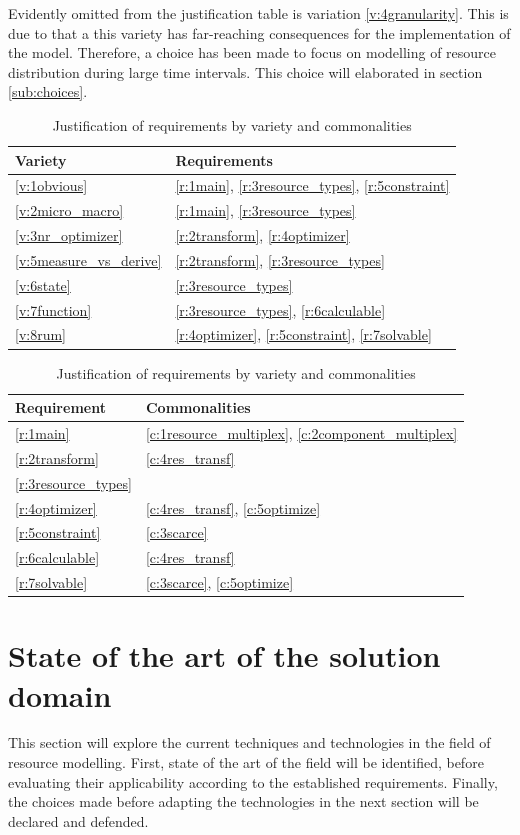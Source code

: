 Evidently omitted from the justification table is variation \ref{v:4granularity}. This is due to that a this variety has far-reaching consequences for the implementation of the model. Therefore, a choice has been made to focus on modelling of resource distribution during large time intervals. This choice will elaborated in section \ref{sub:choices}.
\begin{table}
\centering
\begin{tabular}{|l|l|} \hline
Variety & Requirements \\ \hline
\ref{v:1obvious} & \ref{r:1main}, \ref{r:3resource_types}, \ref{r:5constraint}		\\ \hline
\ref{v:2micro_macro} & \ref{r:1main}, \ref{r:3resource_types} 	\\ \hline
\ref{v:3nr_optimizer} & \ref{r:2transform}, \ref{r:4optimizer} 	\\ \hline
\ref{v:5measure_vs_derive} & \ref{r:2transform}, \ref{r:3resource_types} \\ 	\hline
\ref{v:6state} & \ref{r:3resource_types} 	\\ \hline
\ref{v:7function} & \ref{r:3resource_types}, \ref{r:6calculable} 	\\ \hline
\ref{v:8rum} & \ref{r:4optimizer}, \ref{r:5constraint}, \ref{r:7solvable} 	\\ \hline
\end{tabular}
\hspace{24px}
\begin{tabular}{|l|l|} \hline
Requirement & Commonalities \\ \hline
\ref{r:1main} & \ref{c:1resource_multiplex}, \ref{c:2component_multiplex}	\\ \hline
\ref{r:2transform} & \ref{c:4res_transf}	\\ \hline
\ref{r:3resource_types} &	\\ \hline
\ref{r:4optimizer} & \ref{c:4res_transf}, \ref{c:5optimize} 	\\ \hline
\ref{r:5constraint} & \ref{c:3scarce}	\\ \hline
\ref{r:6calculable} & \ref{c:4res_transf}	\\ \hline
\ref{r:7solvable} & \ref{c:3scarce}, \ref{c:5optimize}	\\ \hline
\end{tabular}
\caption{Justification of requirements by variety and commonalities}
\label{table:justification}
\end{table}

\section{State of the art of the solution domain}
This section will explore the current techniques and technologies in the field of resource modelling. First, state of the art of the field will be identified, before evaluating their applicability according to the established requirements. Finally, the choices made before adapting the technologies in the next section will be declared and defended.

